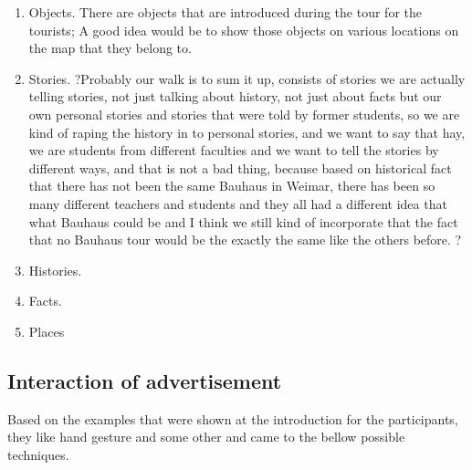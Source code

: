 \begin {enumerate}

\item	Objects.
There are objects that are introduced during the tour for the tourists; A good idea would be to show those objects on various locations on the map that they belong to.
\item	Stories.
?Probably our walk is to sum it up, consists of stories we are actually telling stories, not just talking about history, not just about facts but our own personal stories and stories that were told by former students, so we are kind of raping the history in to personal stories, and we want to say that hay, we are students from different faculties and we want to tell the stories by different ways, and that is not a bad thing, because based on historical fact that there has not been the same Bauhaus in Weimar, there has been so many different teachers and students and they all had a different idea that what Bauhaus could be and I think we still kind of incorporate that the fact that no Bauhaus tour would be the exactly the same like the others before. ?
\item	Histories.
\item	Facts.
\item	Places

\end{enumerate}


\subsection{Interaction of advertisement}
Based on the examples that were shown at the introduction for the participants, they like hand gesture and some other and came to the bellow possible techniques.

